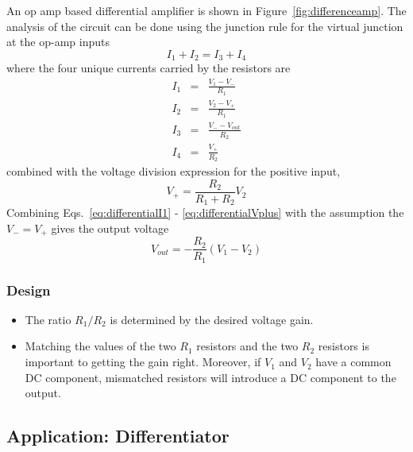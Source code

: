 \documentclass[11pt]{article}
\begin{document}
An op amp based differential amplifier is shown in
Figure~\ref{fig:differenceamp}. The analysis of the circuit can be
done using the junction rule for the virtual junction at the op-amp
inputs
\begin{equation}
  I_1 + I_2 = I_3 + I_4
\end{equation}
where the four unique currents carried by the resistors are
\begin{eqnarray}
  \label{eq:differentialI1}
  I_1 &=& \frac{V_1 - V_-}{R_1}\\ I_2 &=& \frac{V_2 - V_+}{R_1}\\ I_3
  &=& \frac{V_- - V_{out}}{R_2}\\ I_4 &=& \frac{V_+}{R_2}
\end{eqnarray}
combined with the voltage division expression for the positive input,
\begin{equation}
  \label{eq:differentialVplus}
  V_+ = \frac{R_2}{R_1 + R_2} V_2
\end{equation}
Combining Eqs.~\ref{eq:differentialI1} - \ref{eq:differentialVplus}
with the assumption the $V_- = V_+$ gives the output voltage
\begin{equation}
  V_{out} = - \frac{R_2}{R_1} \left(V_1 - V_2\right)
\end{equation}

\subsubsection*{Design}
\begin{itemize}
\item The ratio $R_1/R_2$ is determined by the desired voltage gain.

\item Matching the values of the two $R_1$ resistors and the two $R_2$
  resistors is important to getting the gain right. Moreover, if $V_1$
  and $V_2$ have a common DC component, mismatched resistors will
  introduce a DC component to the output.

\end{itemize}

\subsection{Application: Differentiator}
\label{sec:differentiator}
\end{document}
